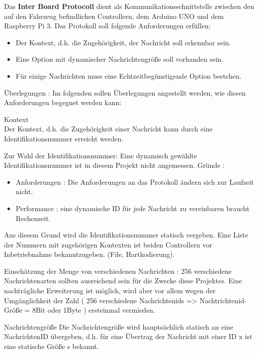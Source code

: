
Das \textbf{Inter Board Protocoll} dient als Kommunikationsschnittstelle zwischen den auf den Fahrzeug befindlichen Controllern, dem Arduino UNO und dem Raspberry Pi 3. Das Protokoll soll folgende Anforderungen erfüllen:

\begin{itemize}

\item Der Kontext, d.h. die Zugehörigkeit, der Nachricht soll erkennbar sein.
\item Eine Option mit dynamischer Nachrichtengröße soll vorhanden sein.
\item Für einige Nachrichten muss eine Echtzeitbegünstigende Option bestehen.

\end{itemize}

\LARGE Überlegungen : 
\normalsize
Im folgenden sollen Überlegungen angestellt werden, wie diesen Anforderungen begegnet werden kann:

\Large Kontext \\
\normalsize
Der Kontext, d.h. die Zugehörigkeit einer Nachricht kann durch eine Identifikationsnummer erreicht werden.

Zur Wahl der Identifikationsnummer: Eine dynamisch gewählte Identifikationsnummer ist in diesem Projekt nicht angemessen. Gründe :

\begin{itemize}
\item Anforderungen : Die Anforderungen an das Protokoll ändern sich zur Laufzeit nicht.
\item Performance : eine dynamische ID für jede Nachricht zu vereinbaren braucht Rechenzeit.
\end{itemize}

Aus diesem Grund wird die Identifikationsnummer statisch vergeben. Eine Liste der Nummern mit zugehörigen Kontexten ist beiden Controllern vor Inbetriebnahme bekanntzugeben. (File, Hartkodierung).

Einschätzung der Menge von verschiedenen Nachrichten :
256 verschiedene Nachrichtenarten sollten ausreichend sein für die Zwecke diese Projektes. Eine nachträgliche Erweiterung ist möglich, wird aber vor allem wegen der Umgänglichkeit der Zahl ( 256 verschiedene Nachrichtenids => Nachtrichtenid-Größe = 8Bit oder 1Byte ) ersteinmal vermieden.

\Large Nachrichtengröße
\normalsize
Die Nachrichtengröße wird hauptsächlich statisch an eine NachrichtenID übergeben, d.h. für eine Übertrag der Nachricht mit einer ID x ist eine statische Größe s bekannt.

